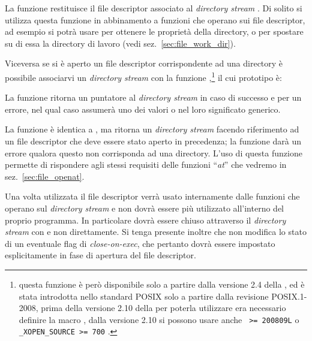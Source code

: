 La funzione restituisce il file descriptor associato al \textit{directory
  stream} . Di solito si utilizza questa funzione in abbinamento a
funzioni che operano sui file descriptor, ad esempio si potrà usare
 per ottenere le proprietà della directory, o  per
spostare su di essa la directory di lavoro (vedi sez.~\ref{sec:file_work_dir}).

Viceversa se si è aperto un file descriptor corrispondente ad una directory è
possibile associarvi un \textit{directory stream} con la funzione
,\footnote{questa funzione è però disponibile solo a partire
  dalla versione 2.4 della , ed è stata introdotta nello standard
  POSIX solo a partire dalla revisione POSIX.1-2008, prima della versione 2.10
  della  per poterla utilizzare era necessario definire la macro
  , dalla versione 2.10 si possono usare anche
  \texttt{ >= 200809L} o \texttt{\_XOPEN\_SOURCE >=
    700} .}  il cui prototipo è:

\begin{funcproto}{
}
{La funzione ritorna un puntatore al \textit{directory stream} in caso di
  successo e  per un errore, nel qual caso  assumerà uno
  dei valori  o  nel loro significato generico.}
\end{funcproto}

La funzione è identica a , ma ritorna un \textit{directory
  stream} facendo riferimento ad un file descriptor  che deve essere
stato aperto in precedenza; la funzione darà un errore qualora questo non
corrisponda ad una directory. L'uso di questa funzione permette di rispondere
agli stessi requisiti delle funzioni ``\textit{at}'' che vedremo in
sez.~\ref{sec:file_openat}.

Una volta utilizzata il file descriptor verrà usato internamente dalle
funzioni che operano sul \textit{directory stream} e non dovrà essere più
utilizzato all'interno del proprio programma. In particolare dovrà essere
chiuso attraverso il \textit{directory stream} con  e non
direttamente. Si tenga presente inoltre che  non modifica lo
stato di un eventuale flag di \textit{close-on-exec}, che pertanto dovrà
essere impostato esplicitamente in fase di apertura del file descriptor.

